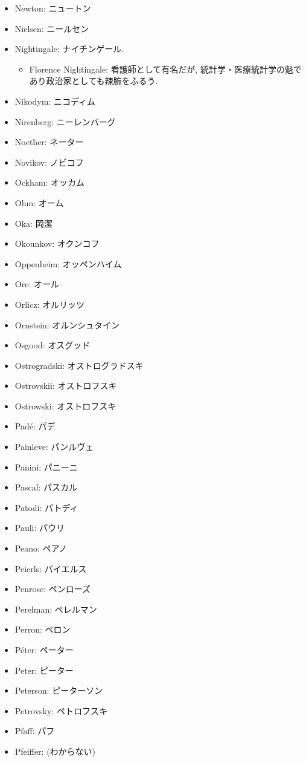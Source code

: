 \documentclass[openany, a4paper, oneside]{jsbook}
\begin{document}
\begin{itemize}
\item Newton: ニュートン
\item Nielsen: ニールセン
\item Nightingale: ナイチンゲール.
\begin{itemize}
\item Florence Nightingale: 看護師として有名だが, 統計学・医療統計学の魁であり政治家としても辣腕をふるう.
\end{itemize}
\item Nikodym: ニコディム
\item Nirenberg: ニーレンバーグ
\item Noether: ネーター
\item Novikov: ノビコフ
\item Ockham: オッカム
\item Ohm: オーム
\item Oka: 岡潔
\item Okounkov: オクンコフ
\item Oppenheim: オッペンハイム
\item Ore: オール
\item Orlicz: オルリッツ
\item Ornstein: オルンシュタイン
\item Osgood: オスグッド
\item Ostrogradski: オストログラドスキ
\item Ostrovskii: オストロフスキ
\item Ostrowski: オストロフスキ
\item Pad\'e: パデ
\item Painleve: パンルヴェ
\item Panini: パニーニ
\item Pascal: パスカル
\item Patodi: パトディ
\item Pauli: パウリ
\item Peano: ペアノ
\item Peierls: パイエルス
\item Penrose: ペンローズ
\item Perelman: ペレルマン
\item Perron: ペロン
\item Péter: ペーター
\item Peter: ピーター
\item Peterson: ピーターソン
\item Petrovsky: ペトロフスキ
\item Pfaff: パフ
\item Pfeiffer: (わからない)

\end{itemize}
\end{document}
